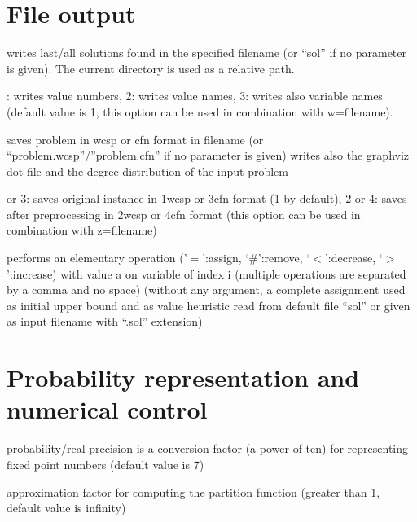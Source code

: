 \documentclass[letterpaper,10pt,openany,oneside,english]{sphinxmanual}
\begin{document}
\section{File output}
\label{\detokenize{userdoc:file-output}}\begin{description}
\sphinxAtStartPar
writes last/all solutions found in the specified
filename (or “sol” if no parameter is given). The current directory
is used as a relative path.

: writes value numbers, 2: writes value names, 3: writes also variable names (default value is 1, this option can be used in combination with \sphinxhyphen{}w=filename).

\sphinxAtStartPar
saves problem in wcsp or cfn format in filename (or
“problem.wcsp”/”problem.cfn” if no parameter is given) writes also
the graphviz dot file and the degree distribution of the input problem

 or 3: saves original instance in 1\sphinxhyphen{}wcsp or 3\sphinxhyphen{}cfn format
(1 by default), 2 or 4: saves
after preprocessing in 2\sphinxhyphen{}wcsp or 4\sphinxhyphen{}cfn format (this option can be
used in combination with \sphinxhyphen{}z=filename)

\sphinxAtStartPar
performs an elementary operation (’\(=\)’:assign, ‘\(\#\)’:remove, ‘\(<\)’:decrease, ‘\(>\)’:increase) with value a on variable of index i (multiple
operations are separated by a comma and no space) (without any
argument, a complete assignment \textendash{} used as initial upper bound and
as value heuristic \textendash{} read from default file “sol” or given as input
filename with “.sol” extension)

\end{description}


\section{Probability representation and numerical control}
\label{\detokenize{userdoc:probability-representation-and-numerical-control}}\begin{description}
\sphinxAtStartPar
probability/real precision is a conversion
factor (a power of ten) for representing fixed point numbers
(default value is 7)

\sphinxAtStartPar
approximation factor for computing the partition
function (greater than 1, default value is infinity)

\end{description}
\end{document}
